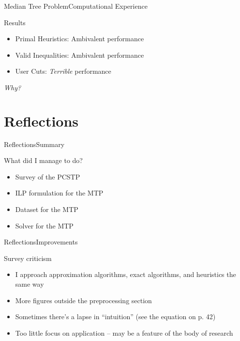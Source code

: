 \documentclass[rgb,dvipsnames]{beamer}
\begin{document}
\begin{frame}{Median Tree Problem}{Computational Experience}
  \begin{block}{Results}
    \pause
    \begin{itemize}[<+->]
    \item Primal Heuristics: Ambivalent performance
    \item Valid Inequalities: Ambivalent performance
    \item User Cuts: \textit{Terrible} performance
    \end{itemize}
  \end{block}
  \pause
  \textit{Why?}
\end{frame}

\section{Reflections}
\begin{frame}{Reflections}{Summary}
  \begin{block}{What did I manage to do?}
    \begin{itemize}
    \item Survey of the PCSTP
    \item ILP formulation for the MTP
    \item Dataset for the MTP
    \item Solver for the MTP
    \end{itemize}
  \end{block}
\end{frame}

\begin{frame}{Reflections}{Improvements}
  \begin{block}{Survey criticism}
    \begin{itemize}[<+->]
    \item I approach approximation algorithms, exact algorithms, and heuristics the same way
    \item More figures outside the preprocessing section
    \item Sometimes there's a lapse in ``intuition'' (see the equation on p. 42)
    \item Too little focus on application -- may be a feature of the body of research
    \end{itemize}
  \end{block}
\end{frame}
\end{document}
